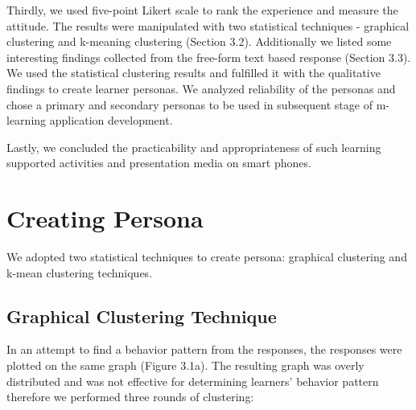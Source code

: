 Thirdly, we used five-point Likert scale to rank the experience and measure the attitude. The results were manipulated with two statistical techniques - graphical clustering and k-meaning clustering (Section 3.2). Additionally we listed some interesting findings collected from the free-form text based response (Section 3.3). We used the statistical clustering results and fulfilled it with the qualitative findings to create learner personas. We analyzed reliability of the personas and chose a primary and secondary personas to be used in subsequent stage of m-learning application development. 

Lastly, we concluded the practicability and appropriateness of such learning supported activities and presentation media on smart phones. 

\section{Creating Persona}

We adopted two statistical techniques to create persona: graphical clustering and k-mean clustering  techniques. 

\subsection{Graphical Clustering Technique}
In an attempt to find a behavior pattern from the responses, the responses were plotted on the same graph (Figure 3.1a). The resulting graph was overly distributed and was not effective for determining learners' behavior pattern therefore we performed three rounds of clustering: 

